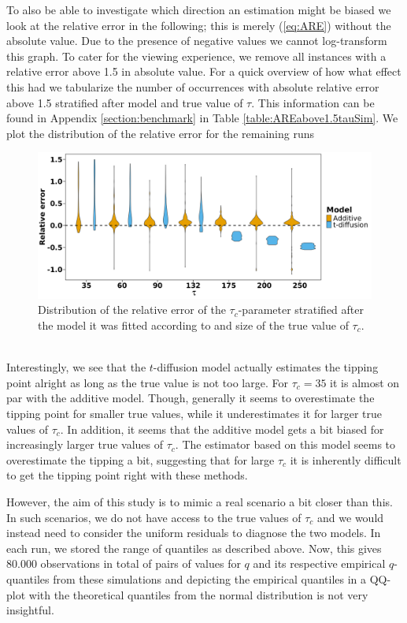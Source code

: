 To also be able to investigate which direction an estimation might be biased we look at the relative error in the following; this is merely (\ref{eq:ARE}) without the absolute value. Due to the presence of negative values we cannot log-transform this graph. To cater for the viewing experience, we remove all instances with a relative error above 1.5 in absolute value. For a quick overview of how what effect this had we tabularize the number of occurrences with absolute relative error above 1.5 stratified after model and true value of $\tau$. This information can be found in Appendix \ref{section:benchmark} in Table \ref{table:AREabove1.5tauSim}. We plot the distribution of the relative error for the remaining runs 
\begin{figure}[h!]
    \begin{center}
    \includegraphics[scale = .075]{figures/RE_dist_tau.jpeg}
    \caption{Distribution of the relative error of the $\tau_c$-parameter stratified after the model it was fitted according to and size of the true value of $\tau_c$.}
    \label{figure:RE_dist_tau}
    \end{center}
\end{figure}\\
Interestingly, we see that the $t$-diffusion model actually estimates the tipping point alright as long as the true value is not too large. For $\tau_c = 35$ it is almost on par with the additive model. Though, generally it seems to overestimate the tipping point for smaller true values, while it underestimates it for larger true values of $\tau_c$. In addition, it seems that the additive model gets a bit biased for increasingly larger true values of $\tau_c$. The estimator based on this model seems to overestimate the tipping a bit, suggesting that for large $\tau_c$ it is inherently difficult to get the tipping point right with these methods.

However, the aim of this study is to mimic a real scenario a bit closer than this. In such scenarios, we do not have access to the true values of $\tau_c$ and we would instead need to consider the uniform residuals to diagnose the two models. In each run, we stored the range of quantiles as described above. Now, this gives $80.000$ observations in total of pairs of values for $q$ and its respective empirical $q$-quantiles from these simulations and depicting the empirical quantiles in a QQ-plot with the theoretical quantiles from the normal distribution is not very insightful.

